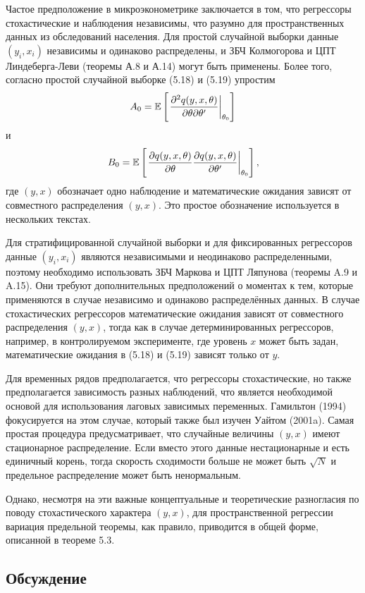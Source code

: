 Частое предположение в микроэконометрике заключается в том, что регрессоры стохастические и  наблюдения независимы, что разумно для пространственных данных из обследований населения. Для простой случайной выборки данные $(y_i,x_i)$ независимы и одинаково распределены, и ЗБЧ Колмогорова и ЦПТ Линдеберга-Леви (теоремы А.8 и А.14) могут быть применены. Более того, согласно простой случайной выборке (5.18) и (5.19) упростим 
\[
A_0=\mathbb{E} \left[  \left. \frac{\partial^2 q(y,x,\theta)}{\partial \theta \partial \theta'} \right|_{\theta_0} \right]
\]
и
\[
B_0=\mathbb{E} \left[ \left. \frac{\partial q(y,x,\theta)}{\partial \theta} \frac{\partial q(y,x,\theta)}{\partial \theta'} \right|_{\theta_0} \right],
\]
где $(y,x)$ обозначает одно наблюдение и математические ожидания зависят от совместного распределения $(y,x)$. Это простое обозначение используется в нескольких текстах.

Для стратифицированной случайной выборки и для фиксированных регрессоров данные $(y_i,x_i)$  являются независимыми и неодинаково распределенными, поэтому необходимо использовать ЗБЧ Маркова и ЦПТ Ляпунова (теоремы A.9 и A.15). Они требуют дополнительных предположений о моментах к тем, которые применяются в случае независимо и одинаково распределённых данных. В случае стохастических регрессоров математические ожидания зависят от совместного распределения $(y,x)$, тогда как в случае детерминированных регрессоров, например, в контролируемом эксперименте, где уровень $x$ может быть задан, математические ожидания в (5.18) и (5.19) зависят только от $y$.

Для временных рядов предполагается, что регрессоры стохастические, но также предполагается зависимость разных наблюдений, что является необходимой основой для использования лаговых зависимых переменных. Гамильтон (1994) фокусируется на этом случае, который также был изучен Уайтом (2001a). Самая простая процедура предусматривает, что случайные величины $(y,x)$ имеют стационарное распределение. Если вместо этого данные нестационарные и есть единичный корень, тогда скорость сходимости больше не может быть $\sqrt{N}$ и предельное распределение может быть ненормальным.

Однако, несмотря на эти важные концептуальные и теоретические разногласия по поводу стохастического характера $(y,x)$, для пространственной регрессии вариация предельной теоремы, как правило, приводится в общей форме, описанной в теореме 5.3.

\subsection{Обсуждение}


